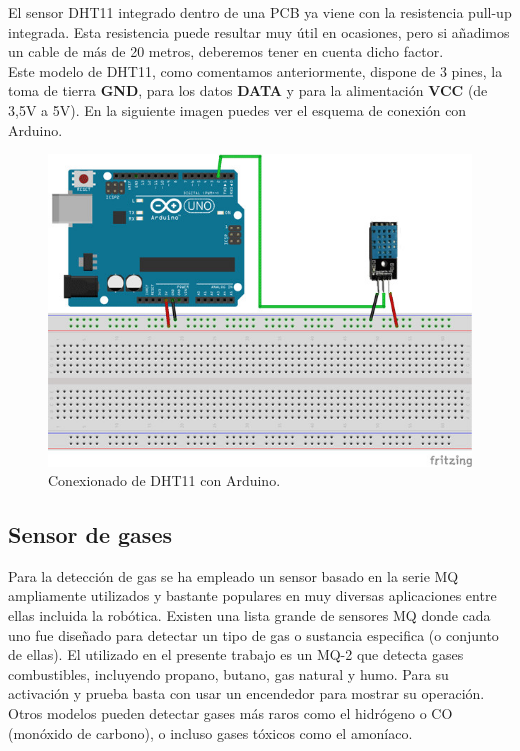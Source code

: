 El sensor DHT11 integrado dentro de una PCB ya viene con la resistencia pull-up integrada. Esta resistencia puede resultar muy útil en ocasiones, pero si añadimos un cable
de más de 20 metros, deberemos tener en cuenta dicho factor.\\

Este modelo de DHT11, como comentamos anteriormente, dispone de 3 pines, la toma de tierra \textbf{GND}, para los datos \textbf{DATA} y para la alimentación \textbf{VCC} 
(de 3,5V a 5V). En la siguiente imagen puedes ver el esquema de conexión con Arduino.\\

\begin{figure}[H]
  \begin{center}
    \includegraphics[scale=0.5]{imagenes/dth11_conexionado.jpg}
  \end{center}
  \caption{Conexionado de DHT11 con Arduino.}
  \label{figura:sensor_dth11_bits}
\end{figure}

\subsection{Sensor de gases}


Para la detección de gas se ha empleado un sensor basado en la serie MQ ampliamente utilizados y bastante populares en muy diversas aplicaciones entre ellas incluida la robótica.
Existen una lista grande de sensores MQ donde cada uno fue diseñado para detectar un tipo de gas o sustancia especifica (o conjunto de ellas). El utilizado en el presente trabajo 
es un MQ-2 que detecta gases combustibles, incluyendo propano, butano, gas natural y humo. Para su activación y prueba basta con usar un encendedor para mostrar su operación. 
Otros modelos pueden detectar gases más raros como el hidrógeno o CO (monóxido de carbono), o incluso gases tóxicos como el amoníaco.\\

